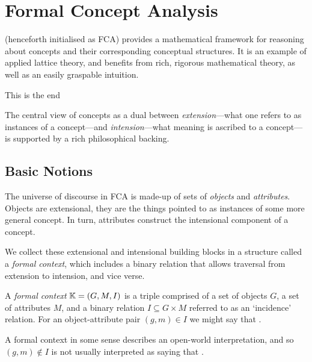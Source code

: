 \chapter{Formal Concept Analysis}
\label{chapter:formal-concept-analysis}

\FCA (henceforth initialised as FCA) provides a mathematical framework for reasoning about concepts and their corresponding conceptual structures. It is an example of applied lattice theory, and benefits from rich, rigorous mathematical theory, as well as an easily graspable intuition. 

This is the end

The central view of concepts as a dual between \textit{extension}---what one refers to as instances of a concept---and \textit{intension}---what meaning is ascribed to a concept---is supported by a rich philosophical backing.   

\section{Basic Notions}
\label{section:basic-notions}
The universe of discourse in FCA is made-up of sets of \textit{objects} and \textit{attributes}. Objects are extensional, they are the things pointed to as instances of some more general concept. In turn, attributes construct the intensional component of a concept.

We collect these extensional and intensional building blocks in a structure called a \textit{formal context}, which includes a binary relation that allows traversal from extension to intension, and vice verse.

\begin{definition}
  \label{definition:formal-context}
  A \textit{formal context} $\mathbb{K} = (G,M,I)$ is a triple comprised of a set of objects $G$, a set of attributes $M$, and a binary relation $I \subseteq G \times M$ referred to as an `incidence' relation. For an object-attribute pair $(g,m) \in I$ we might say that .
\end{definition}

A formal context  in some sense describes an open-world interpretation, and so $(g,m) \not \in I$ is not usually interpreted as saying that .

